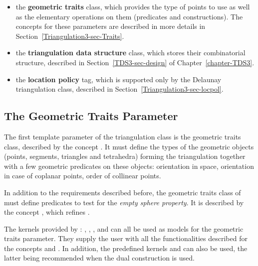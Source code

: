 \begin{itemize}
\item {} the \textbf{geometric traits} class, which provides the type of points
to use as well as the elementary operations on them (predicates and
constructions).  The concepts for these parameters are described in more
details in Section~\ref{Triangulation3-sec-Traits}.
\item {} the \textbf{triangulation data structure} class, which stores their
combinatorial structure, described in Section~\ref{TDS3-sec-design} of
Chapter~\ref{chapter-TDS3}.
\item {} the \textbf{location policy} tag, which is supported only by the Delaunay
triangulation class, described in Section~\ref{Triangulation3-sec-locpol}.
\end{itemize}


\subsection{The Geometric Traits Parameter\label{Triangulation3-sec-Traits}}

The first template parameter of the triangulation class
is the geometric traits class, described by the concept
.  It must define the types of the geometric objects
(points, segments, triangles and tetrahedra) forming the triangulation together
with a few geometric predicates on these objects: orientation in space,
orientation in case of coplanar points, order of collinear points.

In addition to the requirements described before, the geometric traits
class of  must define predicates to test for the
\textit{empty sphere property}.  It is described by the concept
, which refines .

The kernels provided by \cgal: , ,
,  and
 can all be used as models for the geometric traits
parameter.
They supply the user with all the functionalities described for the concepts
 and
.
In addition, the predefined kernels
 and
can also be used, the latter being recommended when the dual construction is
used.

